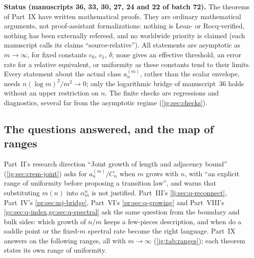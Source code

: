 \documentclass[11pt,a4paper]{article}
\theoremstyle{definition}\newaliascnt{definition}{theorem}
\theoremstyle{remark}\newaliascnt{remark}{theorem}
\begin{document}
\begin{resultbox}
\textbf{Status (manuscripts 36, 33, 30, 27, 24 and 22 of batch 72).} The
theorems of Part~IX have written mathematical proofs. They are ordinary
mathematical arguments, not proof-assistant formalizations: nothing is Lean-
or Rocq-verified, nothing has been externally refereed, and no worldwide
priority is claimed (each manuscript calls its claims ``source-relative'').
All statements are asymptotic as $m\to\infty$, for fixed constants
$c_0$, $c_1$, $\delta$; none gives an effective threshold, an error rate for a
relative equivalent, or uniformity as these constants tend to their limits.
Every statement about the actual class $a_n^{(m)}$, rather than the scalar
envelope, needs $n(\log m)^2/m^2\to0$; only the logarithmic bridge of
manuscript~36 holds without an upper restriction on $n$. The finite checks are
regressions and diagnostics, several far from the asymptotic regime
(\cref{jg:sec:checks}).
\end{resultbox}

\subsection{The questions answered, and the map of ranges}
\label{jg:sec:answer}
Part~II's research direction ``Joint growth of length and adjacency bound''
(\cref{jg:sec:crem-joint}) asks for $a_n^{(m)}/C_n$ when $m$ grows with $n$,
with ``an explicit range of uniformity before proposing a transition law'', and
warns that substituting $m(n)$ into $\alpha_m^n$ is not justified. Part~III's
\cref{lj:sec:q-reconnect}, Part~IV's \cref{pr:sec:mj-bridge}, Part~VI's
\cref{pr:sec:q-growing} and Part~VIII's \cref{gc:sec:q-index,gc:sec:q-spectral}
ask the same question from the boundary and bulk sides: which growth of $n/m$
keeps a few-pieces description, and when do a saddle point or the fixed-$m$
spectral rate become the right language. Part~IX answers on the following
ranges, all with $m\to\infty$ (\cref{jg:tab:ranges}); each theorem states its
own range of uniformity.
\end{document}

